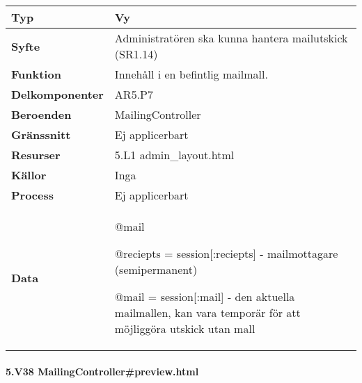 \documentclass[a4paper, twoside, 11pt, titlepage]{article}
\begin{document}
			\begin {table} [ht] \begin{tabular} {  p{3.5cm} p{11.6cm} }
				\hline
				{\sffamily\textbf{Typ}} & {Vy} \\
				\hline
				{\sffamily\textbf{Syfte}} & {Administratören ska kunna hantera mailutskick (SR1.14)} \\
				\hline
				{\sffamily\textbf{Funktion}} & {Innehåll i en befintlig mailmall.} \\
				\hline
				{\sffamily\textbf{Delkomponenter}} & {AR5.P7} \\
				\hline
				{\sffamily\textbf{Beroenden}} & {MailingController} \\
				\hline
				{\sffamily\textbf{Gränssnitt}} & {Ej applicerbart} \\
				\hline
				{\sffamily\textbf{Resurser}} & {5.L1 admin\_layout.html} \\
				\hline
				{\sffamily\textbf{Källor}} & {Inga} \\
				\hline
				{\sffamily\textbf{Process}} & {Ej applicerbart} \\
				\hline
				{\sffamily\textbf{Data}} & {@mail

@reciepts = session[:reciepts] - mailmottagare (semipermanent)

@mail = session[:mail] - den aktuella mailmallen, kan vara temporär för att möjliggöra utskick utan mall} \\
				\hline
			\end{tabular} \end{table} \FloatBarrier


			\paragraph{5.V38 MailingController\#preview.html}\
\end{document}

